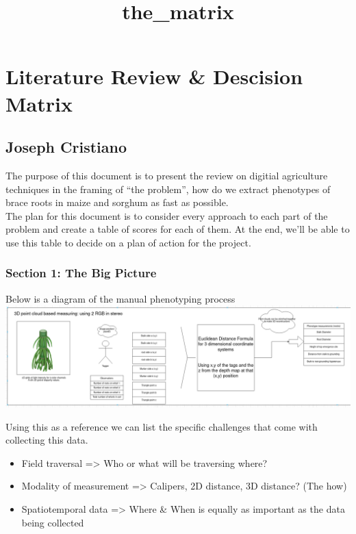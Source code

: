 \documentclass[11pt]{article}
\title{the\_matrix}
\providecommand{\tightlist}{%
      \setlength{\itemsep}{0pt}\setlength{\parskip}{0pt}}
\begin{document}
    
    \maketitle
    
    

    
    \hypertarget{literature-review-descision-matrix}{%
\section{Literature Review \& Descision
Matrix}\label{literature-review-descision-matrix}}

\hypertarget{joseph-cristiano}{%
\subsection{Joseph Cristiano}\label{joseph-cristiano}}

The purpose of this document is to present the review on digitial
agriculture techniques in the framing of ``the problem'', how do we
extract phenotypes of brace roots in maize and sorghum as fast as
possible.\\
The plan for this document is to consider every approach to each part of
the problem and create a table of scores for each of them. At the end,
we'll be able to use this table to decide on a plan of action for the
project.

    \hypertarget{section-1-the-big-picture}{%
\subsubsection{Section 1: The Big
Picture}\label{section-1-the-big-picture}}

Below is a diagram of the manual phenotyping process
\includegraphics{the_matrix_files/image.png}

    Using this as a reference we can list the specific challenges that come
with collecting this data.

\begin{itemize}
\tightlist
\item
  Field traversal =\textgreater{} Who or what will be traversing where?
\item
  Modality of measurement =\textgreater{} Calipers, 2D distance, 3D
  distance? (The how)
\item
  Spatiotemporal data =\textgreater{} Where \& When is equally as
  important as the data being collected
\end{itemize}
\end{document}
